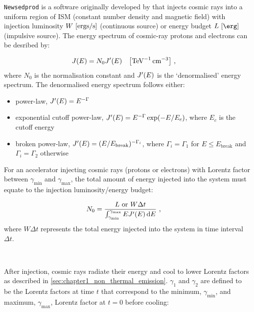 {\tt Newsedprod} is a software originally developed by \citep{fabien} that injects cosmic rays into a uniform region of ISM (constant number density and magnetic field) with injection luminosity $W~\qty[\si{ergs\per\second}]$ (continuous source) or energy budget $L~\qty[\ergs]$  (impulsive source). The energy spectrum of cosmic-ray protons and electrons can be desribed by:

\begin{equation}
    \begin{aligned}
  	  J\qty(E)&= N_0 J'\qty(E)\quad\qty[\si{\per\tera\electronvolt\per\centi\meter\cubed}]\text{ ,}
    \end{aligned}
\end{equation}
\noindent where $N_0$ is the normalisation constant and $J'\qty(E)$ is the `denormalised' energy spectrum. The denormalised energy spectrum follows either:

\begin{itemize}
    \itemsep0em 
    \item power-law, $J'\qty(E)=E^{-\Gamma}$
    \item exponential cutoff power-law, $J'\qty(E)=E^{-\Gamma}\exp(-E/E_c)$, where $E_c$ is the cutoff energy
    \item broken power-law, $J'\qty(E)=(E/E_\text{break})^{-\Gamma_i}$, where $\Gamma_i=\Gamma_1$ for $E\leq E_\text{break}$ and $\Gamma_i = \Gamma_2$ otherwise
\end{itemize}

\noindent For an accelerator injecting cosmic rays (protons or electrons) with Lorentz factor between $\gamma_\text{min}$ and $\gamma_\text{max}$, the total amount of energy injected into the system must equate to the injection luminosity/energy budget:

\begin{equation}
    \begin{aligned}
 	   N_0&=\frac{L\text{ or }W\Delta t}{\int_{\gamma_\text{min}}^{\gamma_\text{max}} EJ'\qty(E)\dd{E}}\text{ ,}
    \end{aligned} \label{eq:chapter_7_energy_budget}
\end{equation}
\noindent where $W\Delta t$ represents the total energy injected into the system in time interval $\Delta t$.
\par~\par
After injection, cosmic rays radiate their energy and cool to lower Lorentz factors as described in \autoref{sec:chapter1_non_thermal_emission}. $\gamma_1$ and $\gamma_2$ are defined to be the Lorentz factors at time $t$ that correspond to the minimum, $\gamma_\text{min}$, and maximum, $\gamma_\text{max}$, Lorentz factor at $t=0$ before cooling:

